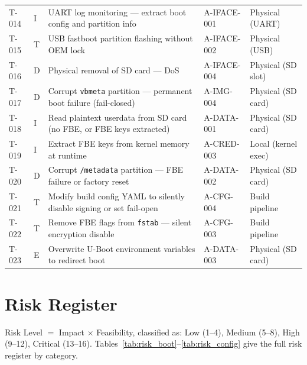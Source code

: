 \begin{tabularx}{\textwidth}{p{0.8cm} p{1.5cm} X p{3.2cm} p{2.8cm}}
T-014 & I & UART log monitoring --- extract boot config and partition info & A-IFACE-001 & Physical (UART) \\
T-015 & T & USB fastboot partition flashing without OEM lock & A-IFACE-002 & Physical (USB) \\
T-016 & D & Physical removal of SD card --- DoS & A-IFACE-004 & Physical (SD slot) \\
T-017 & D & Corrupt \texttt{vbmeta} partition --- permanent boot failure (fail-closed) & A-IMG-004 & Physical (SD card) \\
T-018 & I & Read plaintext userdata from SD card (no FBE, or FBE keys extracted) & A-DATA-001 & Physical (SD card) \\
T-019 & I & Extract FBE keys from kernel memory at runtime & A-CRED-003 & Local (kernel exec) \\
T-020 & D & Corrupt \texttt{/metadata} partition --- FBE failure or factory reset & A-DATA-002 & Physical (SD card) \\
T-021 & T & Modify build config YAML to silently disable signing or set fail-open & A-CFG-004 & Build pipeline \\
T-022 & T & Remove FBE flags from \texttt{fstab} --- silent encryption disable & A-CFG-003 & Build pipeline \\
T-023 & E & Overwrite U-Boot environment variables to redirect boot & A-DATA-003 & Physical (SD card) \\
\end{tabularx}

\section{Risk Register}
\label{sec:tara_risks}

Risk Level $=$ Impact $\times$ Feasibility, classified as: Low (1--4), Medium (5--8), High (9--12), Critical (13--16). Tables~\ref{tab:risk_boot}--\ref{tab:risk_config} give the full risk register by category.


